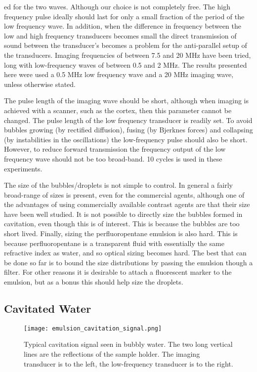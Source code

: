 ed for the two waves.
 Although our choice is not completely free.
 The high frequency pulse ideally should last for only a small fraction
 of the period of the low frequency wave.
 In addition, 
 when the difference in frequency between the low and high frequency transducers
 becomes small the direct transmission of sound between the transducer's
 becomes a problem for the anti-parallel setup of the transducers.
 Imaging frequencies of between 7.5 and 20 MHz have been tried, 
long with low-frequency waves of between 0.5 and 2 MHz.
 The results presented here were used a 0.5 MHz low frequency wave and
 a 20 MHz imaging wave, unless otherwise stated.

 The pulse length of the imaging wave should be short, 
 although when imaging is achieved with a scanner, such as the cortex,
 then this parameter cannot be changed.
 The pulse length of the low frequency transducer is readily set.
 To avoid bubbles growing (by rectified diffusion), fusing (by Bjerknes
 forces) and collapsing (by instabilities in the oscillations) the low-frequency
 pulse should also be short.
 However, to reduce forward transmission the  frequency output of the
 low frequency wave should not be 
 too broad-band.
 10 cycles is used in these experiments.

 The size of the bubbles/droplets is not simple to control.
 In general a fairly broad-range of sizes is present, even for the
 commercial agents,
 although one of the advantages of using commercially available
 contrast agents are that their size have been well studied.
 It is not possible to directly size the bubbles formed in cavitation,
 even though this is of interest.
 This is because the bubbles are too short lived.
 Finally, 
 sizing the perfluoropentane emulsion is also hard.
 This is because perfluoropentane is a transparent fluid with
 essentially the same refractive index as water,
 and so optical sizing becomes hard.
 The best that can be done so far is to bound the size distributions by
 passing the emulsion though a filter.
 For other reasons it is desirable to attach a fluorescent
 marker to the emulsion, but as a bonus this should help size the
 droplets.




\subsection{Cavitated Water}\label{sec:water_vapourisation}



\begin{figure}[h]
     \centering
          \texttt{[image: emulsion\_cavitation\_signal.png]}
     \caption{Typical cavitation signal seen in bubbly water.
     The two long vertical lines are the reflections of the sample
     holder.
     The imaging transducer is to the left,
     the low-frequency transducer is to the right.}
   \label{fig:cavitation}
\end{figure}


